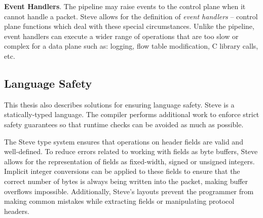 \textbf{Event Handlers}.
The pipeline may raise events to the control plane when
it cannot handle a packet. Steve allows for the definition of
\emph{event handlers} -- control plane functions which deal
with these special circumstances.
Unlike the pipeline, event handlers can execute a wider range of
operations that are too slow or complex for a data plane such as:
logging, flow table modification, C library calls, etc.

%

\subsection{Language Safety}
%
%

This thesis also describes solutions for ensuring language safety.
Steve is a statically-typed language. The compiler performs additional work to
enforce strict safety guarantees so that runtime checks can be avoided as much
as possible.

The Steve type system ensures that operations on header fields are valid and
well-defined.
To reduce errors related to working with fields as byte buffers, Steve allows
for the representation of fields as fixed-width, signed or unsigned
integers.
Implicit integer conversions can be applied to these fields to ensure that the correct number of bytes is always being written into the packet, making buffer overflows impossible.
Additionally, Steve's layouts prevent the programmer from making common mistakes while extracting fields or manipulating protocol headers.


